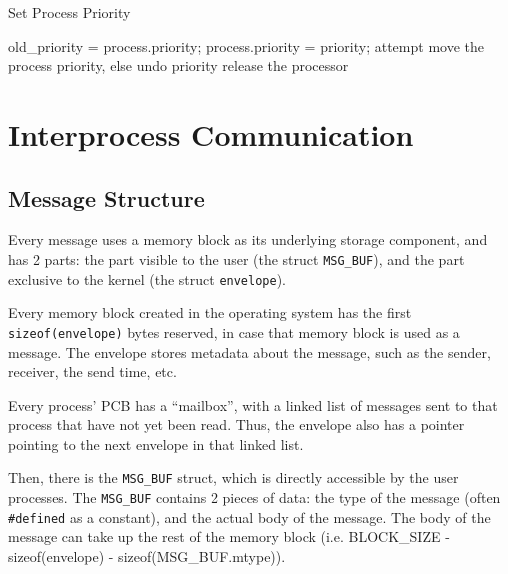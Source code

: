 \documentclass[12pt]{report}
\begin{document}
\begin{algorithm}[H]
  \caption{Set Process Priority}
  \begin{algorithmic}[1]
            \State old_priority = process.priority;
            \State process.priority = priority;
              \State attempt move the process priority, else undo priority
            \EndIf     
            \State release the processor
          \EndIf
        \EndIf
      \EndFor
    \EndIf
  \EndFunction
  \end{algorithmic}
\end{algorithm}


\section{Interprocess Communication}

\subsection{Message Structure}

Every message uses a memory block as its underlying storage component, and has 2 parts: the part visible to the user (the struct \texttt{MSG_BUF}), and the part exclusive to the kernel (the struct \texttt{envelope}). 

Every memory block created in the operating system has the first \texttt{sizeof(envelope)} bytes reserved, in case that memory block is used as a message. The envelope stores metadata about the message, such as the sender, receiver, the send time, etc. 

Every process' PCB has a ``mailbox'', with a linked list of messages sent to that process that have not yet been read. Thus, the envelope also has a pointer pointing to the next envelope in that linked list.

Then, there is the \texttt{MSG_BUF} struct, which is directly accessible by the user processes. The \texttt{MSG_BUF} contains 2 pieces of data: the type of the message (often \texttt{\#defined} as a constant), and the actual body of the message. The body of the message can take up the rest of the memory block (i.e. BLOCK_SIZE - sizeof(envelope) - sizeof(MSG_BUF.mtype)). 
\end{document}
